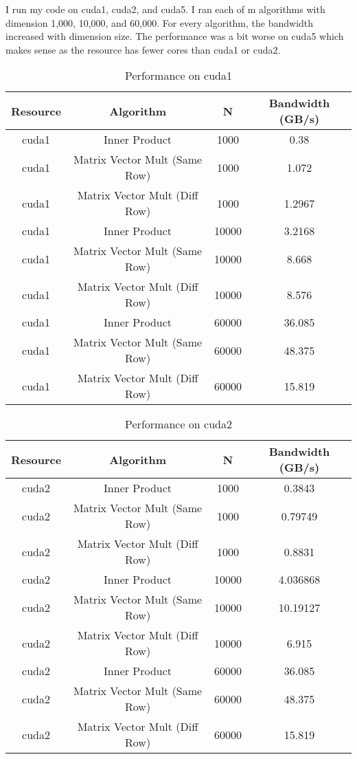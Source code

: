 \documentclass[12pt]{article}
\begin{document}
I run my code on cuda1, cuda2, and cuda5. I ran each of m algorithms with dimension 1,000, 10,000, and 60,000. For every algorithm, the bandwidth increased with dimension size. The performance was a bit worse on cuda5 which makes sense as the resource has fewer cores than cuda1 or cuda2.


\begin{table}[h!]
\centering
\begin{tabular}{ |c|c|c|c| }
\hline
 Resource & Algorithm & N & Bandwidth (GB/s) \\ 
 \hline
cuda1 & Inner Product & 1000 & 0.38\\
\hline
cuda1 & Matrix Vector Mult (Same Row) & 1000 & 1.072\\
\hline
cuda1 & Matrix Vector Mult (Diff Row) & 1000 & 1.2967\\
\hline
cuda1 & Inner Product & 10000 &  3.2168\\
\hline
cuda1 & Matrix Vector Mult (Same Row) & 10000 & 8.668\\
\hline
cuda1 & Matrix Vector Mult (Diff Row) & 10000 & 8.576\\
\hline
cuda1 & Inner Product & 60000 &  36.085\\
\hline
cuda1 & Matrix Vector Mult (Same Row) & 60000 & 48.375\\
\hline
cuda1 & Matrix Vector Mult (Diff Row) & 60000 & 15.819\\
\hline
\end{tabular}
 \caption{Performance on cuda1}
 \label{cuda1}
 \end{table}


\begin{table}[h!]
\centering
\begin{tabular}{ |c|c|c|c| }
\hline
 Resource & Algorithm & N & Bandwidth (GB/s) \\ 
 \hline
cuda2 & Inner Product & 1000 & 0.3843\\
\hline
cuda2 & Matrix Vector Mult (Same Row) & 1000 & 0.79749\\
\hline
cuda2 & Matrix Vector Mult (Diff Row) & 1000 & 0.8831\\
\hline
cuda2 & Inner Product & 10000 &  4.036868\\
\hline
cuda2 & Matrix Vector Mult (Same Row) & 10000 & 10.19127\\
\hline
cuda2 & Matrix Vector Mult (Diff Row) & 10000 & 6.915\\
\hline
cuda2 & Inner Product & 60000 &  36.085\\
\hline
cuda2 & Matrix Vector Mult (Same Row) & 60000 & 48.375\\
\hline
cuda2 & Matrix Vector Mult (Diff Row) & 60000 & 15.819\\
\hline
\end{tabular}
 \caption{Performance on cuda2}
 \label{cuda2}
 \end{table}
\end{document}
